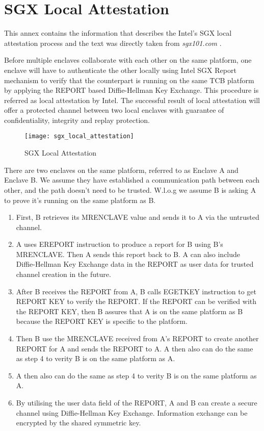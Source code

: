 \chapter{SGX Local Attestation}
\label{ann:sgx_local_attestation}

This annex contains the information that describes the Intel's \gls{SGX} local attestation process and the text was directly taken from \textit{sgx101.com} \cite{sgx:localAttestation}.

Before multiple enclaves collaborate with each other on the same platform, one enclave will have to authenticate the other locally using Intel SGX Report mechanism to verify that the counterpart is running on the same TCB platform by applying the REPORT based Diffie-Hellman Key Exchange. This procedure is referred as local attestation by Intel. The successful result of local attestation will offer a protected channel between two local enclaves with guarantee of confidentiality, integrity and replay protection.

\begin{figure}[htbp]
	\centerline{\texttt{[image: sgx\_local\_attestation]}}%
	\caption{SGX Local Attestation}
	\label{fig:sgx_local_attestation}
\end{figure}

There are two enclaves on the same platform, referred to as Enclave A and Enclave B. We assume they have established a communication path between each other, and the path doesn’t need to be trusted. W.l.o.g we assume B is asking A to prove it’s running on the same platform as B.

\begin{enumerate}
	\item First, B retrieves its MRENCLAVE value and sends it to A via the untrusted channel.
	\item A uses EREPORT instruction to produce a report for B using B’s MRENCLAVE. Then A sends this report back to B. A can also include Diffie-Hellman Key Exchange data in the REPORT as user data for trusted channel creation in the future.
	\item After B receives the REPORT from A, B calls EGETKEY instruction to get REPORT KEY to verify the REPORT. If the REPORT can be verified with the REPORT KEY, then B assures that A is on the same platform as B because the REPORT KEY is specific to the platform.
	\item Then B use the MRENCLAVE received from A’s REPORT to create another REPORT for A and sends the REPORT to A.
A then also can do the same as step 4 to verity B is on the same platform as A.
	\item A then also can do the same as step 4 to verity B is on the same platform as A.
	\item By utilising the user data field of the REPORT, A and B can create a secure channel using Diffie-Hellman Key Exchange. Information exchange can be encrypted by the shared symmetric key.
\end{enumerate}